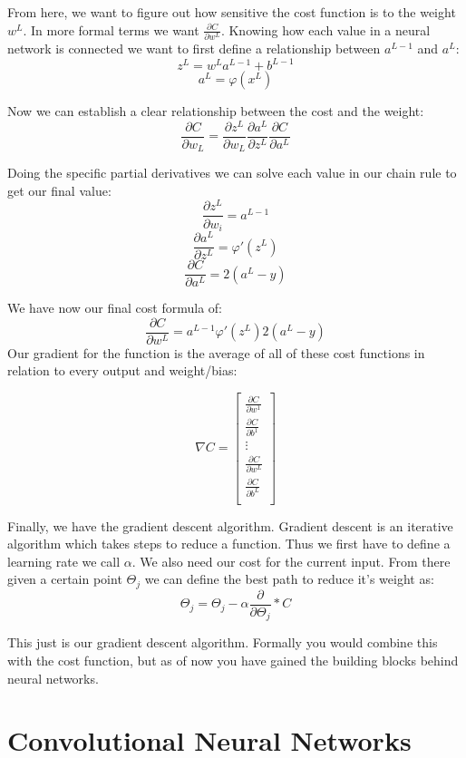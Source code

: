 \documentclass[12pt]{article}
\begin{document}
 From here, we want to figure out how sensitive the cost function is to the weight $w^L$. In more formal terms we want $\frac{\partial C}{\partial w^L}$. Knowing how each value in a neural network is connected we want to first define a relationship between $a^{L-1}$ and $a^L$:
 $$
 z^{L} = w^{L}a^{L-1}+b^{L-1}
 $$
 $$
 a^{L} = \varphi (x^L)
 $$
 
 Now we can establish a clear relationship between the cost and the weight:
 $$
 \frac{\partial C}{\partial w_L} = \frac{\partial z^L}{\partial w_L} \frac{\partial a^L}{\partial z^L} \frac{\partial C}{\partial a^L}
 $$
 
 Doing the specific partial derivatives we can solve each value in our chain rule to get our final value:
 $$\frac{\partial z^L}{\partial w_i} = a^{L-1}$$
 $$\frac{\partial a^L}{\partial z^L} = \varphi'(z^L)$$
 $$ \frac{\partial C}{\partial a^L} = 2(a^L-y)$$
 
 We have now our final cost formula of:
 $$
  \frac{\partial C}{\partial w^L} = a^{L-1} \varphi'(z^L) 2(a^L-y)
 $$
 \newpage
 Our gradient for the function is the average of all of these cost functions in relation to every output and weight/bias:

 
 \[
 \nabla C = \begin{bmatrix} 
      \frac{\partial C}{\partial w^1} \\
      \frac{\partial C}{\partial b^1} \\
    \vdots  \\
     \frac{\partial C}{\partial w^L} \\
      \frac{\partial C}{\partial b^L} \\
    \end{bmatrix}
\]
 
 Finally, we have the gradient descent algorithm. Gradient descent is an iterative algorithm which takes steps to reduce a function. Thus we first have to define a learning rate we call $\alpha$. We also need our cost for the current input. From there given a certain point $\Theta_j$ we can define the best path to reduce it's weight as:
 $$
 \Theta_j = \Theta_j - \alpha\frac{\partial }{\partial \Theta_j} *C
 $$
 
 This just is our gradient descent algorithm. Formally you would combine this with the cost function, but as of now you have gained the building blocks behind neural networks.

\vspace{-4ex}
\section*{Convolutional Neural Networks}
\vspace{-3ex}
\end{document}
